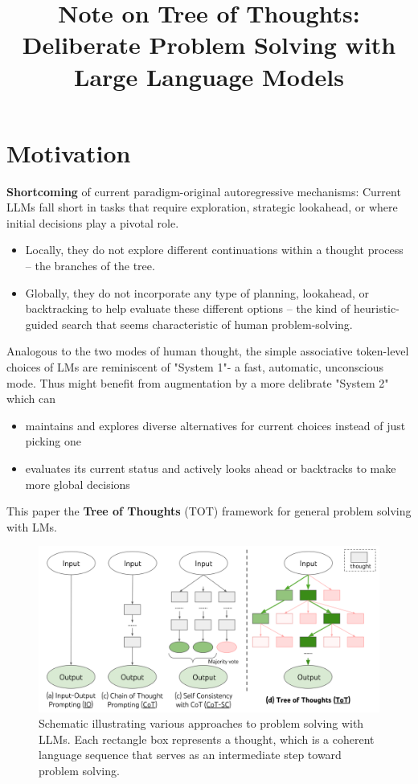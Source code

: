 \documentclass{article}
\title{Note on Tree of Thoughts: Deliberate Problem Solving with Large Language Models}
\begin{document}
\maketitle

\section{Motivation}

\textbf{Shortcoming} of current paradigm-original autoregressive mechanisms: Current LLMs 
fall short in tasks that require exploration, strategic lookahead, or where initial decisions 
play a pivotal role.

\begin{itemize}
    \item Locally, they do not explore different continuations within a thought process – the branches of the tree.
    \item Globally, they do not incorporate any type of planning, lookahead, or backtracking to help evaluate these different options – the kind of heuristic-guided search that seems characteristic of human problem-solving.
\end{itemize}

Analogous to the two modes of human thought, the simple associative token-level choices of 
LMs are reminiscent of "System 1"- a fast, automatic, unconscious mode. Thus might benefit from 
augmentation by a more delibrate "System 2" which can 

\begin{itemize}
    \item maintains and explores diverse alternatives for current choices instead of just picking one
    \item evaluates its current status and actively looks ahead or backtracks to make more global decisions
\end{itemize}

This paper the \textbf{Tree of Thoughts} (TOT) framework for general problem solving with LMs.

\begin{figure}[H]
    \centering
    \includegraphics[width=\textwidth]{./Images/Figure1.png}
    \caption{Schematic illustrating various approaches to problem solving with LLMs. Each rectangle box represents a thought, which is a coherent language sequence that serves as an intermediate step toward problem solving.}
    \label{fig:Figure1}
\end{figure}
\end{document}
